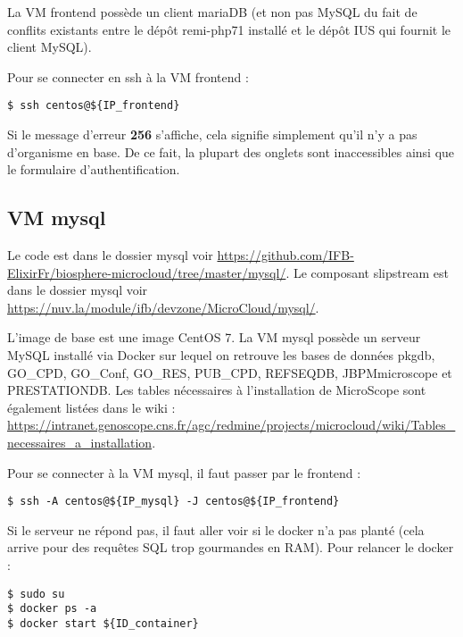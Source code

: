 La VM frontend possède un client mariaDB (et non pas MySQL du fait de conflits existants entre le dépôt remi-php71 installé et le dépôt IUS qui fournit le client MySQL).\newline

Pour se connecter en ssh à la VM frontend : 
\begin{lstlisting}[style=Bash]
$ ssh centos@${IP_frontend}
\end{lstlisting}

\begin{mycolorbox}Si le message d’erreur \textbf{256} s’affiche, cela signifie simplement qu’il n’y a pas d’organisme en base. De ce fait, la plupart des onglets sont inaccessibles ainsi que le formulaire d’authentification.
\end{mycolorbox}

\subsection {VM mysql}\label{mysql}

Le code est dans le dossier mysql voir \url{https://github.com/IFB-ElixirFr/biosphere-microcloud/tree/master/mysql/}.
Le composant slipstream est dans le dossier mysql voir \url{https://nuv.la/module/ifb/devzone/MicroCloud/mysql/}.

L'image de base est une image CentOS 7. La VM mysql possède un serveur MySQL installé via Docker sur lequel on retrouve les bases de données pkgdb, GO\_CPD, GO\_Conf, GO\_RES, PUB\_CPD, REFSEQDB, JBPMmicroscope et PRESTATIONDB.
\newline
Les tables nécessaires à l'installation de MicroScope sont également listées dans le wiki : \url{https://intranet.genoscope.cns.fr/agc/redmine/projects/microcloud/wiki/Tables_necessaires_a_installation}.
\newline

Pour se connecter à la VM mysql, il faut passer par le frontend :
\begin{lstlisting}[style=bash]
$ ssh -A centos@${IP_mysql} -J centos@${IP_frontend}
\end{lstlisting}
\bigskip

Si le serveur ne répond pas, il faut aller voir si le docker n'a pas planté (cela arrive pour des requêtes SQL trop gourmandes en RAM).
Pour relancer le docker :
\begin{lstlisting}[style=bash]
$ sudo su
$ docker ps -a
$ docker start ${ID_container}
\end{lstlisting}

